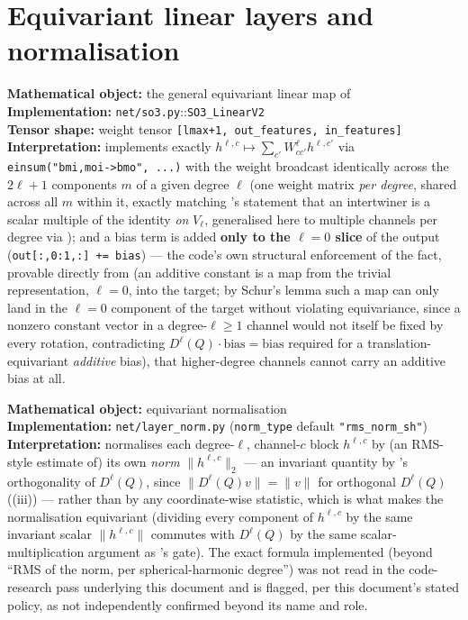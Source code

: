 \documentclass[11pt,a4paper]{report}
\theoremstyle{definition}
\theoremstyle{remark}
\newcommand{\file}[1]{\texttt{#1}}
\newcommand{\pyfunc}[1]{\texttt{#1}}
\newcommand{\shape}[1]{\texttt{[#1]}}
\begin{document}
\section{Equivariant linear layers and normalisation}
\label{sec:equiformer-linear-norm}

\begin{codebox}
\textbf{Mathematical object:} the general equivariant linear map of
 \\
\textbf{Implementation:} \file{net/so3.py}::\pyfunc{SO3\_LinearV2} \\
\textbf{Tensor shape:} weight tensor \shape{lmax+1, out\_features, in\_features} \\
\textbf{Interpretation:} implements exactly
$h^{\ell,c}\mapsto\sum_{c'}W^\ell_{cc'}h^{\ell,c'}$ via
\texttt{einsum("bmi,moi->bmo", ...)} with the weight broadcast identically
across the $2\ell+1$ components $m$ of a given degree $\ell$ (one weight
matrix \emph{per degree}, shared across all $m$ within it, exactly matching
's statement that an intertwiner is a scalar
multiple of the identity \emph{on} $V_\ell$, generalised here to multiple
channels per degree via ); and a bias term
is added \textbf{only to the $\ell=0$ slice} of the output
(\texttt{out[:,0:1,:] += bias}) --- the code's own structural enforcement
of the fact, provable directly from  (an additive
constant is a map from the trivial representation, $\ell=0$, into the
target; by Schur's lemma such a map can only land in the $\ell=0$
component of the target without violating equivariance, since a nonzero
constant vector in a degree-$\ell\ge1$ channel would not itself be fixed
by every rotation, contradicting $D^\ell(Q)\cdot\mathrm{bias}=\mathrm{bias}$
required for a translation-equivariant \emph{additive} bias), that
higher-degree channels cannot carry an additive bias at all.
\end{codebox}

\begin{codebox}
\textbf{Mathematical object:} equivariant normalisation \\
\textbf{Implementation:} \file{net/layer\_norm.py} (\texttt{norm\_type}
default \texttt{"rms\_norm\_sh"}) \\
\textbf{Interpretation:} normalises each degree-$\ell$, channel-$c$ block
$h^{\ell,c}$ by (an RMS-style estimate of) its own \emph{norm}
$\|h^{\ell,c}\|_2$ --- an invariant quantity by 's
orthogonality of $D^\ell(Q)$, since $\|D^\ell(Q)v\|=\|v\|$ for orthogonal
$D^\ell(Q)$ ((iii)) --- rather than by any
coordinate-wise statistic, which is what makes the normalisation
equivariant (dividing every component of $h^{\ell,c}$ by the same
invariant scalar $\|h^{\ell,c}\|$ commutes with $D^\ell(Q)$ by the same
scalar-multiplication argument as 's gate). The
exact formula implemented (beyond ``RMS of the norm, per spherical-harmonic
degree'') was not read in the code-research pass underlying this document
and is flagged, per this document's stated policy, as not independently
confirmed beyond its name and role.
\end{codebox}
\end{document}
